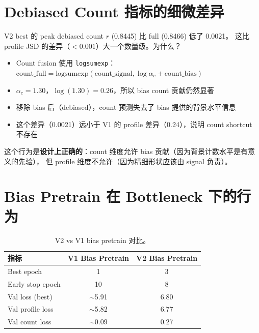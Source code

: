 \documentclass[11pt,a4paper]{ctexart}
\begin{document}
\section{Debiased Count 指标的细微差异}

V2 best 的 peak debiased count $r$ (0.8445) 比 full (0.8466) 低了 0.0021。
这比 profile JSD 的差异（$< 0.001$）大一个数量级。为什么？

\begin{itemize}[leftmargin=2em]
  \item Count fusion 使用 \texttt{logsumexp}：$\text{count\_full} = \text{logsumexp}(\text{count\_signal}, \log\alpha_c + \text{count\_bias})$
  \item $\alpha_c = 1.30$，$\log(1.30) = 0.26$，所以 bias count 贡献仍然显著
  \item 移除 bias 后（debiased），count 预测失去了 bias 提供的背景水平信息
  \item 这个差异（0.0021）远小于 V1 的 profile 差异（0.24），说明 count shortcut 不存在
\end{itemize}

这个行为是\textbf{设计上正确的}：count 维度允许 bias 贡献（因为背景计数水平是有意义的先验），
但 profile 维度不允许（因为精细形状应该由 signal 负责）。

\section{Bias Pretrain 在 Bottleneck 下的行为}

\begin{table}[H]
\centering
\small
\caption{V2 vs V1 bias pretrain 对比。}
\begin{tabular}{lcc}
\toprule
指标 & V1 Bias Pretrain & V2 Bias Pretrain \\
\midrule
Best epoch & 1 & 3 \\
Early stop epoch & 10 & 8 \\
Val loss (best) & $\sim$5.91 & 6.80 \\
Val profile loss & $\sim$5.82 & 6.77 \\
Val count loss & $\sim$0.09 & 0.27 \\
\bottomrule
\end{tabular}
\end{table}
\end{document}
